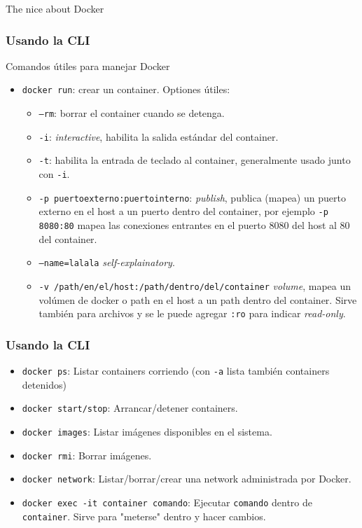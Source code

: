 \documentclass[xcolor={dvipsnames}]{beamer}
\begin{document}
\begin{frame}[fragile]
	\Huge The nice about Docker
\end{frame}

\begin{frame}[fragile]
	\frametitle{Usando la CLI}
	Comandos útiles para manejar Docker
	\begin{itemize}
		\item \texttt{docker run}: crear un container. Optiones útiles:
		\begin{itemize}
			\item \texttt{--rm}: borrar el container cuando se detenga.
			\item \texttt{-i}: \textit{interactive}, habilita la salida estándar del container.
			\item \texttt{-t}: habilita la entrada de teclado al container, generalmente usado junto con \texttt{-i}.
			\item \texttt{-p puertoexterno:puertointerno}: \textit{publish}, publica (mapea) un puerto externo en el host a un puerto dentro del container, por ejemplo \texttt{-p 8080:80} mapea las conexiones entrantes en el puerto 8080 del host al 80 del container.
			\item \texttt{--name=lalala} \textit{self-explainatory}.
			\item \texttt{-v /path/en/el/host:/path/dentro/del/container} \textit{volume}, mapea un volúmen de docker o path en el host a un path dentro del container. Sirve también para archivos y se le puede agregar \texttt{:ro} para indicar \textit{read-only}.
		\end{itemize}
	\end{itemize}
\end{frame}

\begin{frame}[fragile]
	\frametitle{Usando la CLI}
	\begin{itemize}
		\item \texttt{docker ps}: Listar containers corriendo (con \texttt{-a} lista también containers detenidos)
		\item \texttt{docker start/stop}: Arrancar/detener containers.
		\item \texttt{docker images}: Listar imágenes disponibles en el sistema.
		\item \texttt{docker rmi}: Borrar imágenes.
		\item \texttt{docker network}: Listar/borrar/crear una network administrada por Docker.
		\item \texttt{docker exec -it container comando}: Ejecutar \texttt{comando} dentro de \texttt{container}. Sirve para "meterse" dentro y hacer cambios.
	\end{itemize}
\end{frame}
\end{document}

